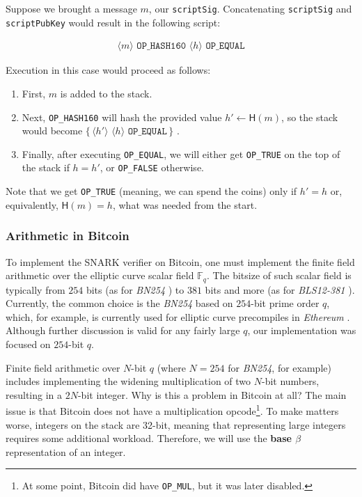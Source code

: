 \documentclass{iacrtrans}
\newcommand{\elem}[1]{\, \langle #1 \rangle \,}
\newcommand{\opcode}[1]{\, \texttt{#1} \,}
\newcommand{\script}[1]{ $\big\{ #1 \big\}$ }
\begin{document}
Suppose we brought a message $m$, our \texttt{scriptSig}. Concatenating \texttt{scriptSig} and \texttt{scriptPubKey} would result in the following script:
\begin{empheqboxed}
\begin{align*}
    \elem{m} \opcode{OP\_HASH160} \elem{h} \opcode{OP\_EQUAL}
\end{align*}
\end{empheqboxed}

Execution in this case would proceed as follows:
\begin{enumerate}
    \item First, $m$ is added to the stack.
    \item Next, \texttt{OP\_HASH160} will hash the provided value $h' \gets \mathsf{H}(m)$, so the stack would become \script{\elem{h'} \elem{h} \opcode{OP\_EQUAL}}.
    \item Finally, after executing \texttt{OP\_EQUAL}, we will either get \texttt{OP\_TRUE} on the top of the stack if $h = h'$, or \texttt{OP\_FALSE} otherwise. 
\end{enumerate}

Note that we get \texttt{OP\_TRUE} (meaning, we can spend the coins) only if $h'=h$ or, equivalently, $\mathsf{H}(m)=h$, what was needed from the start.

\subsubsection{Arithmetic in Bitcoin}\label{section:arithmetic_bitcoin}

To implement the SNARK verifier on Bitcoin, one must implement the finite field arithmetic over the elliptic curve scalar field $\mathbb{F}_q$. The bitsize of such scalar field is typically from $254$ bits (as for \textit{BN254} \cite{bn254}) to $381$ bits and more (as for \textit{BLS12-381} \cite{bls12}). Currently, the common choice is the \textit{BN254} based on $254$-bit prime order $q$, which, for example, is currently used for elliptic curve precompiles in \textit{Ethereum} \cite{ethereum}. Although further discussion is valid for any fairly large $q$, our implementation was focused on $254$-bit $q$. 

Finite field arithmetic over $N$-bit $q$ (where $N=254$ for \textit{BN254}, for example) includes implementing the widening multiplication of two $N$-bit numbers, resulting in a $2N$-bit integer. Why is this a problem in Bitcoin at all? The main issue is that Bitcoin does not have a multiplication opcode\footnote{At some point, Bitcoin did have \texttt{OP\_MUL}, but it was later disabled.}. To make matters worse, integers on the stack are 32-bit, meaning that representing large integers requires some additional workload. Therefore, we will use the \textbf{base $\beta$} representation of an integer.
\end{document}
